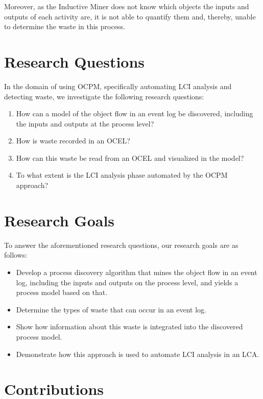 Moreover, as the Inductive Miner does not know which objects the inputs and outputs of each activity are, it is not able to quantify them and, thereby, unable to determine the waste in this process.



\section{Research Questions}



In the domain of using OCPM, specifically automating LCI analysis and detecting waste, we investigate the following research questions:
\begin{enumerate}
	\item How can a model of the object flow in an event log be discovered, including the inputs and outputs at the process level?
	\item How is waste recorded in an OCEL?
	\item How can this waste be read from an OCEL and visualized in the model?
    \item To what extent is the LCI analysis phase automated by the OCPM approach?
\end{enumerate}



\section{Research Goals}



To answer the aforementioned research questions, our research goals are as follows:
\begin{itemize}
	\item Develop a process discovery algorithm that mines the object flow in an event log, including the inputs and outputs on the process level, and yields a process model based on that.
	\item Determine the types of waste that can occur in an event log.
	\item Show how information about this waste is integrated into the discovered process model.
    \item Demonstrate how this approach is used to automate LCI analysis in an LCA.
\end{itemize}



\section{Contributions}


